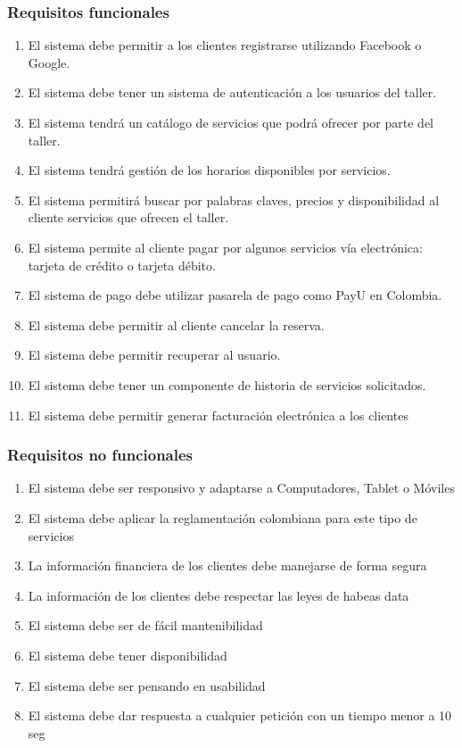 \documentclass[10pt,a4paper,openany]{book}
\begin{document}
\subsubsection{Requisitos funcionales}

\begin{enumerate}
\item El sistema debe permitir a los clientes registrarse utilizando Facebook o Google.
\item El sistema debe tener un sistema de autenticación a los usuarios del taller.
\item El sistema tendrá un catálogo de servicios que podrá ofrecer por parte del taller.
\item El sistema tendrá gestión de los horarios disponibles por servicios.
\item El sistema permitirá buscar por palabras claves, precios y disponibilidad al cliente servicios que ofrecen el taller.
\item El sistema permite al cliente pagar por algunos servicios vía electrónica: tarjeta de crédito o tarjeta débito.
\item El sistema de pago debe utilizar pasarela de pago como PayU en Colombia.
\item El sistema debe permitir al cliente cancelar la reserva.
\item El sistema debe permitir recuperar al usuario.
\item El sistema debe tener un componente de historia de servicios solicitados.
\item El sistema debe permitir generar facturación electrónica a los clientes
\end{enumerate}


\subsubsection{Requisitos no funcionales}

\begin{enumerate}
\item El sistema debe ser responsivo y adaptarse a Computadores, Tablet o Móviles
\item El sistema debe aplicar la reglamentación colombiana para este tipo de servicios
\item La información financiera de los clientes debe manejarse de forma segura
\item La información de los clientes debe respectar las leyes de habeas data
\item El sistema debe ser de fácil mantenibilidad
\item El sistema debe tener disponibilidad
\item El sistema debe ser pensando en usabilidad
\item El sistema debe dar respuesta a cualquier petición con un tiempo menor a 10 seg
\end{enumerate}
\end{document}

